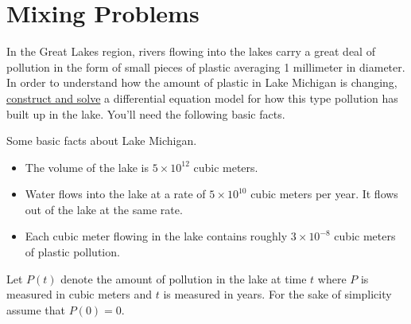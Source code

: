\newpage\section{Mixing Problems}
\begin{problem}
     In the Great Lakes region, rivers flowing into the lakes carry a great deal of
     pollution in the form of small pieces of plastic averaging 1 millimeter in diameter.
     In order to understand how the amount of plastic in Lake Michigan is changing,
     \underline{construct and solve} a differential equation model for how this type pollution has
     built up in the lake.  You'll need the following basic facts.  

     Some basic facts about Lake Michigan.
     \begin{itemize}
         \item The volume of the lake is $5 \times 10^{12}$ cubic meters.
         \item Water flows into the lake at a rate of $5 \times 10^{10}$ cubic meters per
             year.  It flows out of the lake at the same rate.
         \item Each cubic meter flowing in the lake contains roughly $3 \times 10^{-8}$
             cubic meters of plastic pollution.
     \end{itemize}

     Let $P(t)$ denote the amount of pollution in the lake at time $t$ where $P$ is
     measured in cubic meters and $t$ is measured in years.  For the sake of simplicity
     assume that $P(0) = 0$.
\end{problem}

